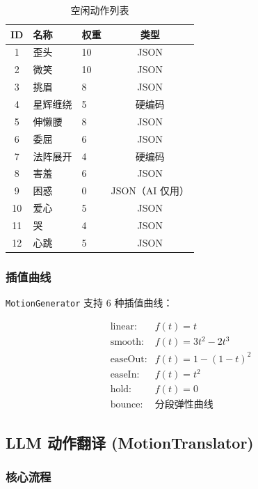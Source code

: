\documentclass[12pt,a4paper]{ctexart}
\begin{document}
\begin{table}[H]
\centering
\caption{空闲动作列表}
\label{tab:idle-actions}
\begin{tabular}{cllc}
\toprule
\textbf{ID} & \textbf{名称} & \textbf{权重} & \textbf{类型} \\
\midrule
1 & 歪头 & 10 & JSON \\
2 & 微笑 & 10 & JSON \\
3 & 挑眉 & 8 & JSON \\
4 & 星辉缠绕 & 5 & 硬编码 \\
5 & 伸懒腰 & 8 & JSON \\
6 & 委屈 & 6 & JSON \\
7 & 法阵展开 & 4 & 硬编码 \\
8 & 害羞 & 6 & JSON \\
9 & 困惑 & 0 & JSON（AI 仅用）\\
10 & 爱心 & 5 & JSON \\
11 & 哭 & 4 & JSON \\
12 & 心跳 & 5 & JSON \\
\bottomrule
\end{tabular}
\end{table}

\subsubsection{插值曲线}

\texttt{MotionGenerator} 支持 6 种插值曲线：

\[
\begin{array}{ll}
\text{linear:} & f(t) = t \\
\text{smooth:} & f(t) = 3t^{2} - 2t^{3} \\
\text{easeOut:} & f(t) = 1 - (1-t)^{2} \\
\text{easeIn:} & f(t) = t^{2} \\
\text{hold:} & f(t) = 0 \\
\text{bounce:} & \text{分段弹性曲线}
\end{array}
\]

\subsection{LLM 动作翻译 (MotionTranslator)}

\subsubsection{核心流程}
\end{document}
